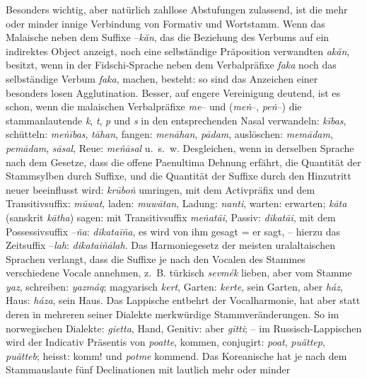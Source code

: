 \label{IV.III.II.4.8c} Besonders wichtig, aber natürlich zahllose Abstufungen zulassend, ist die mehr oder minder innige Verbindung von Formativ und Wortstamm. Wenn das Malaische neben dem Suffixe –\textit{kăn}, das die Beziehung des Verbums auf ein indirektes Object anzeigt, noch eine selbständige Präposition verwandten  \textit{akăn}, besitzt, wenn in der Fidschi-Sprache neben dem Verbalpräfixe \textit{faka} noch das selbständige Verbum \textit{faka}, machen, besteht: so sind das Anzeichen einer besonders losen Agglutination. Besser, auf engere Vereinigung deutend, ist es schon, wenn die malaischen Verbalpräfixe \textit{me}– und  (\textit{meṅ}–, \textit{peṅ}–) die stamman\-\label{fp.333}lautende  \textit{k}, \textit{t}, \textit{p} und \textit{s} in den entsprechenden Nasal verwandeln: \textit{kības}, schütteln: \textit{meṅības}, \textit{tāhan}, fangen: \textit{menāhan}, \textit{pādam}, auslöschen: \textit{memādam}, \textit{pemādam}, \textit{sāsal}, Reue: \textit{meñāsal} u.~s.~w. Desgleichen, wenn in derselben Sprache nach dem Gesetze, dass die offene Paenultima Dehnung erfährt, die Quantität der Stammsylben durch  Suffixe, und die Quantität der Suffixe durch den Hinzutritt neuer beeinflusst wird: \textit{krūboṅ} umringen, mit dem Activpräfix und dem Transitivsuffix:  \textit{mūwat}, laden: \textit{muwātan}, Ladung: \textit{nanti}, warten:  erwarten; \textit{kāta} (sanskrit \textit{kātha}) sagen: mit Transitivsuffix \textit{meṅatāi}, Passiv: \textit{dikatāi}, mit dem Possessivsuffix –\textit{ña}: \textit{dikataīña}, es wird von ihm gesagt = er sagt, – hierzu das Zeitsuffix –\textit{lah}: \textit{dikataiñālah}. \label{fp.202} Das Harmoniegesetz der meisten uralaltaischen Sprachen verlangt, dass die Suffixe je nach den Vocalen des Stammes verschiedene Vocale annehmen, z.~B. türkisch \textit{sevmék} lieben, aber vom Stamme \textit{yaz}, schreiben: \textit{yazmáq}; magyarisch \textit{kert}, Garten: \textit{kerte}, sein Garten, aber \textit{ház}, Haus: \textit{háza}, sein Haus. Das Lappische entbehrt der Vocalharmonie, hat aber statt deren in mehreren seiner Dialekte merkwürdige Stammveränderungen. So im norwegischen Dialekte: \textit{gietta}, Hand, Genitiv:  aber  \textit{gitti}; – im Russisch-Lappischen wird der Indicativ Präsentis von \textit{poatte}, kommen, conjugirt:  \textit{poat}, \textit{puättep},  \textit{puätteb};  heisst: komm! und \textit{potme} kommend. Das Koreanische hat je nach dem Stammauslaute fünf Declinationen mit lautlich mehr oder minder 